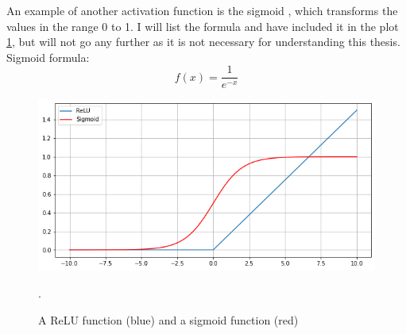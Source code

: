         An example of another activation function is the sigmoid \cite{sharma2019new_activation_func}, which transforms the values in the range 0 to 1. I will list the formula and have included it in the plot \ref{activation_fig}, but will not go any further as it is not necessary for understanding this thesis. Sigmoid formula:
            \begin{equation} \label{sigmoid_eq}
                f(x) = \dfrac{1}{e^{-x}} 
            \end{equation}
            
            \begin{figure}[H]
                \centering
                \includegraphics[scale=0.5]{figures/activation.png}
                \caption[ReLu and sigmoid]{A ReLU function (blue) and a sigmoid function (red)}.
              	\medskip 
                \label{activation_fig}
            \end{figure}

